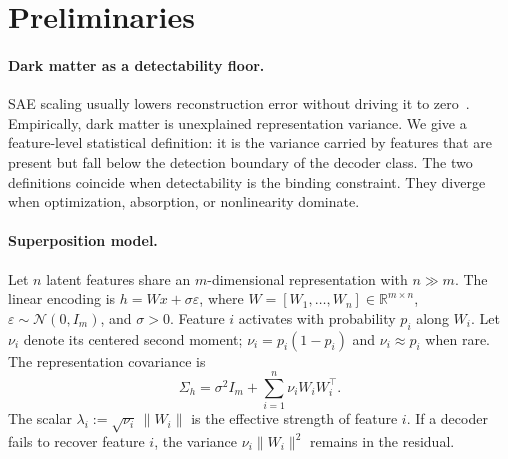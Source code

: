 \documentclass{article}
\theoremstyle{plain}
\begin{document}
\section{Preliminaries}
\label{sec:prelim}

\paragraph{Dark matter as a detectability floor.}
SAE scaling usually lowers reconstruction error without driving it to zero~\citep{gao2025scaling,engels2025dark}. Empirically, dark matter is unexplained representation variance. We give a feature-level statistical definition: it is the variance carried by features that are present but fall below the detection boundary of the decoder class. The two definitions coincide when detectability is the binding constraint. They diverge when optimization, absorption, or nonlinearity dominate.

\paragraph{Superposition model.}
Let $n$ latent features share an $m$-dimensional representation with $n\gg m$. The linear encoding is $h=Wx+\sigma\varepsilon$, where $W=[W_1,\ldots,W_n]\in\mathbb{R}^{m\times n}$, $\varepsilon\sim\mathcal{N}(0,I_m)$, and $\sigma>0$. Feature $i$ activates with probability $p_i$ along $W_i$. Let $\nu_i$ denote its centered second moment; $\nu_i=p_i(1-p_i)$ and $\nu_i\approx p_i$ when rare. The representation covariance is
\begin{equation}
\Sigma_h=\sigma^2 I_m+\sum_{i=1}^n \nu_i W_i W_i^{\top}.
\end{equation}
The scalar $\lambda_i:=\sqrt{\nu_i}\,\lVert W_i\rVert$ is the effective strength of feature $i$. If a decoder fails to recover feature $i$, the variance $\nu_i\lVert W_i\rVert^2$ remains in the residual.
\end{document}
